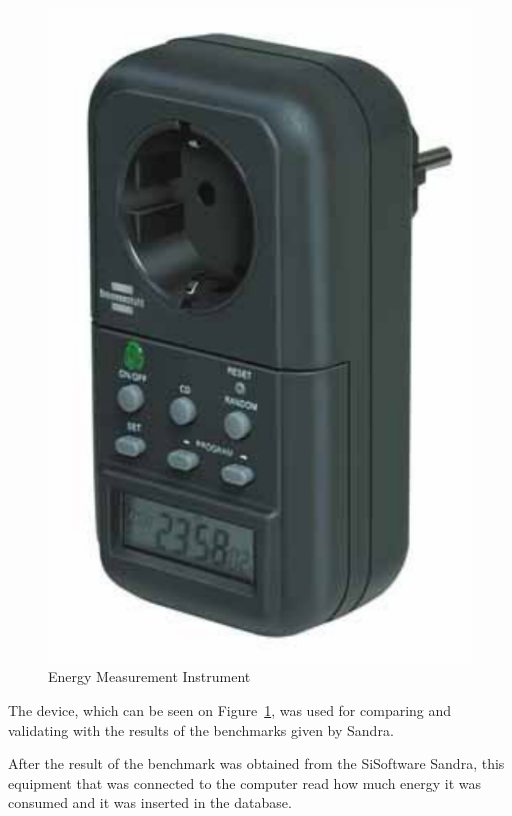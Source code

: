        \begin{figure}[!htb]
            \centering
                \includegraphics[scale=0.6]{graphics/energy_measurement_instrument}
                \caption{Energy Measurement Instrument}
                \label{fig:energy_measurement_instrument}
        \end{figure}
    The device, which can be seen on Figure~\ref{fig:energy_measurement_instrument}, was used for comparing and validating with the results of the benchmarks given by Sandra.

    After the result of the benchmark was obtained from the SiSoftware Sandra, this equipment that was connected to the computer read how much energy it was consumed and it was inserted in the database.
